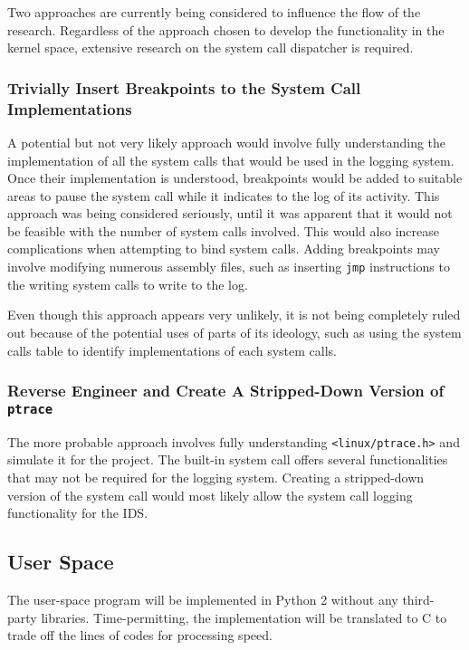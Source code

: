 \documentclass[paper=usletter, fontsize=12pt]{article}
\begin{document}
    Two approaches are currently being considered to influence the flow of the
    research. Regardless of the approach chosen to develop the functionality in
    the kernel space, extensive research on the system call dispatcher is
    required.

    \subsubsection{Trivially Insert Breakpoints to the System Call
    Implementations} A potential but not very likely approach would involve
    fully understanding the implementation of all the system calls that would
    be used in the logging system. Once their implementation is understood,
    breakpoints would be added to suitable areas to pause the system call while
    it indicates to the log of its activity. This approach was being considered
    seriously, until it was apparent that it would not be feasible with the
    number of system calls involved. This would also increase complications
    when attempting to bind system calls. Adding breakpoints may involve
    modifying numerous assembly files, such as inserting \texttt{jmp}
    instructions to the writing system calls to write to the log.

    Even though this approach appears very unlikely, it is not being completely
    ruled out because of the potential uses of parts of its ideology, such as
    using the system calls table to identify implementations of each system
    calls.

    \subsubsection{Reverse Engineer and Create A Stripped-Down Version of
    \texttt{ptrace}} The more probable approach involves fully understanding
    \texttt{<linux/ptrace.h>} and simulate it for the project. The built-in
    system call offers several functionalities that may not be required for the
    logging system. Creating a stripped-down version of the system call would
    most likely allow the system call logging functionality for the IDS.

    \subsection{User Space} The user-space program will be implemented in
    Python 2 without any third-party libraries. Time-permitting, the
    implementation will be translated to C to trade off the lines of codes for
    processing speed.
\end{document}

